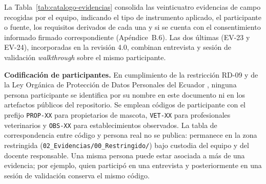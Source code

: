 \documentclass[journal,onecolumn]{IEEEtran}
\begin{document}
	La Tabla~\ref{tab:catalogo-evidencias} consolida las veinticuatro evidencias
	de campo recogidas por el equipo, indicando el tipo de instrumento
	aplicado, el participante o fuente, los requisitos derivados de cada una y
	si se cuenta con el consentimiento informado firmado correspondiente
	(Apéndice~B.6). Las dos últimas (EV-23 y EV-24), incorporadas en la
	revisión 4.0, combinan entrevista y sesión de validación
	\emph{walkthrough} sobre el mismo participante.
	
	\textbf{Codificación de participantes.} En cumplimiento de la restricción
	RD-09 y de la Ley Orgánica de Protección de Datos Personales del Ecuador
	\cite{lopdp2021}, ninguna persona participante se identifica por su nombre
	en este documento ni en los artefactos públicos del repositorio. Se emplean
	códigos de participante con el prefijo \texttt{PROP-XX} para propietarios de
	mascota, \texttt{VET-XX} para profesionales veterinarios y \texttt{OBS-XX}
	para establecimientos observados. La tabla de correspondencia entre código y
	persona real no se publica: permanece en la zona restringida
	(\texttt{02\_Evidencias/00\_Restringido/}) bajo custodia del equipo y del
	docente responsable. Una misma persona puede estar asociada a más de una
	evidencia; por ejemplo, quien participó en una entrevista y posteriormente
	en una sesión de validación conserva el mismo código.
	
\end{document}
